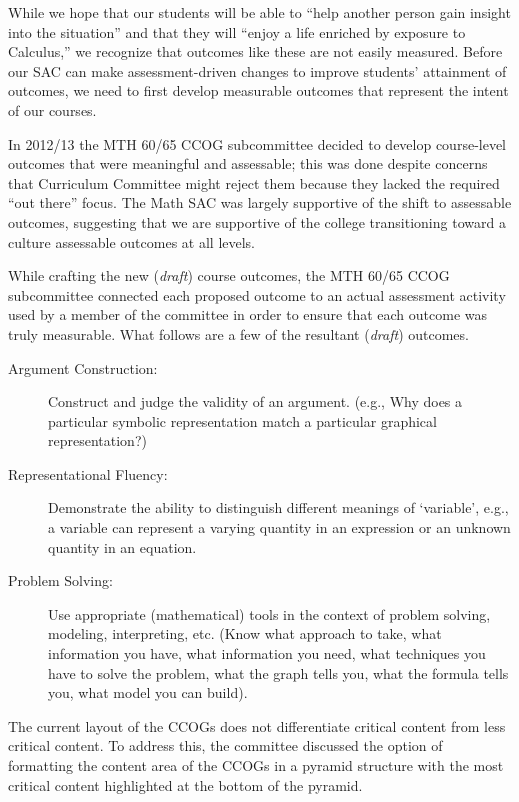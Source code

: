 While we hope that our students will be able to ``help another person gain insight into the situation'' and that they will ``enjoy a life enriched by exposure to Calculus,'' we recognize that outcomes like these are not easily measured. Before our SAC can make assessment-driven changes to improve students' attainment of outcomes, we need to first develop measurable outcomes that represent the intent of our courses.

In 2012/13 the MTH 60/65 CCOG subcommittee decided to develop course-level outcomes that were meaningful and assessable; this was done despite concerns that Curriculum Committee might reject them because they lacked the required ``out there'' focus.  The Math SAC was largely supportive of the shift to assessable outcomes, suggesting that we are supportive of the college transitioning toward a culture assessable outcomes at all levels.  

While crafting the new (\emph{draft}) course outcomes, the MTH 60/65 CCOG subcommittee connected each proposed outcome to an actual assessment activity used by a member of the committee in order to ensure that each outcome was truly measurable.  What follows are a few of the resultant (\emph{draft}) outcomes.
\begin{description}
\item[Argument Construction:] Construct and judge the validity of an argument. (e.g., Why does a particular symbolic representation match a particular graphical representation?)

\item[Representational Fluency:] Demonstrate the ability to distinguish different meanings of `variable', e.g., a variable can represent a varying quantity in an expression or an unknown quantity in an equation.

\item[Problem Solving:] Use appropriate (mathematical) tools in the context of problem solving, modeling, interpreting, etc. (Know what approach to take, what information you have, what information you need, what techniques you have to solve the problem, what the graph tells you, what the formula tells you, what model you can build).
\end{description}

The current layout of the CCOGs does not differentiate critical content from less critical content.  To address this, the committee discussed the option of formatting the content area of the CCOGs in a pyramid structure with the most critical content highlighted at the bottom of the pyramid.  


